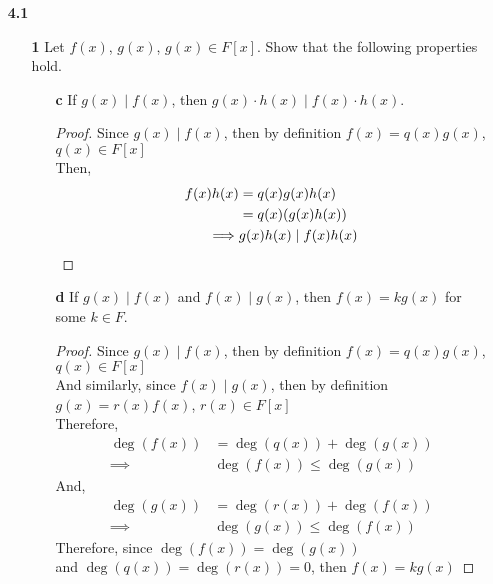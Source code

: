 \documentclass[paper=usletter, fontsize=12pt]{article}
\begin{document}

    \begin{itemize}

        \item[\textbf{4.1}]
        \begin{enumerate}

            \item[\textbf{1}] Let $f(x)$, $g(x)$, $g(x) \in F[x]$. Show that
            the following properties hold.
            \begin{enumerate}

                \item[\textbf{c}] If $g(x) \mid f(x)$, then $g(x) \cdot h(x)
                \mid f(x) \cdot h(x)$.
                \begin{proof}

                    Since $g(x) \mid f(x)$, then by definition $f(x)=q(x)g(x)$,
                    $q(x) \in F[x]$\\
                    Then,
                    \begin{align*}
                        f(x)h(x) &= q(x)g(x)h(x)\\
                        & = q(x)(g(x)h(x))\\
                        \implies & g(x)h(x) \mid f(x)h(x) \qedhere
                    \end{align*}

                \end{proof}

                \item[\textbf{d}] If $g(x) \mid f(x)$ and $f(x) \mid g(x)$,
                then $f(x)=kg(x)$ for some $k\in F$.
                \begin{proof}

                    Since $g(x) \mid f(x)$, then by definition $f(x)=q(x)g(x)$,
                    $q(x) \in F[x]$\\
                    And similarly, since $f(x) \mid g(x)$, then by definition
                    $g(x)=r(x)f(x)$, $r(x) \in F[x]$\\
                    Therefore,
                    \begin{align*}
                        \deg(f(x)) & = \deg(q(x)) + \deg(g(x))\\
                        \implies & \deg(f(x)) \le \deg(g(x))
                    \end{align*}
                    And,
                    \begin{align*}
                        \deg(g(x)) & = \deg(r(x)) + \deg(f(x))\\
                        \implies & \deg(g(x)) \le \deg(f(x))
                    \end{align*}
                    Therefore, since $\deg(f(x)) = \deg(g(x))$ \\ and
                    $\deg(q(x)) = \deg(r(x))=0$, then $f(x)=kg(x)$ \qedhere


\end{proof}
\end{enumerate}
\end{enumerate}
\end{itemize}
\end{document}
